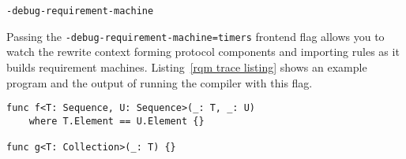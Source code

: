 \documentclass[../generics]{subfiles}
\begin{document}
\texttt{-debug-requirement-machine}

Passing the \texttt{-debug-requirement-machine=timers} frontend flag allows you to watch the rewrite context forming protocol components and importing rules as it builds requirement machines. Listing~\ref{rqm trace listing} shows an example program and the output of running the compiler with this flag.

\begin{listing}\label{rqm trace listing}
\begin{Verbatim}
func f<T: Sequence, U: Sequence>(_: T, _: U)
    where T.Element == U.Element {}

func g<T: Collection>(_: T) {}


\end{Verbatim}
\end{listing}
\end{document}
